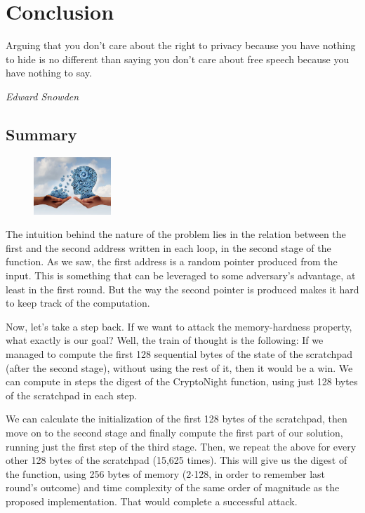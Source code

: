 \chapter{Conclusion}
%
\epigraph{Arguing that you don't care about the right to privacy because you have nothing to hide is no different than saying you don't care about free speech because you have nothing to say.}{\textit{Edward Snowden}}
%
\section{Summary}
\begin{figure}
\centering
\includegraphics[width=0.26\textwidth]{Images/Summary/knowledge.jpg}
\end{figure}
The intuition behind the nature of the problem lies in the relation between the first and the second address written in each loop, in the second stage of the function. As we saw, the first address is a random pointer produced from the input. This is something that can be leveraged to some adversary's advantage, at least in the first round. But the way the second pointer is produced makes it hard to keep track of the computation.

Now, let's take a step back. If we want to attack the memory-hardness property, what exactly is our goal? Well, the train of thought is the following: If we managed to compute the first 128 sequential bytes of the state of the scratchpad (after the second stage), without using the rest of it, then it would be a win. We can compute in steps the digest of the CryptoNight function, using just 128 bytes of the scratchpad in each step.

We can calculate the initialization of the first 128 bytes of the scratchpad, then move on to the second stage and finally compute the first part of our solution, running just the first step of the third stage. Then, we repeat the above for every other 128 bytes of the scratchpad (15,625 times). This will give us the digest of the function, using 256 bytes of memory (2$\cdot$128, in order to remember last round's outcome) and time complexity of the same order of magnitude as the proposed implementation. That would complete a successful attack.
\pagebreak


